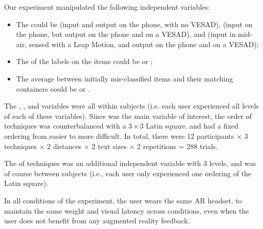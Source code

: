 Our experiment manipulated the following independent variables:

\begin{itemize}
 \item The  could be  (input and output on the phone, with no VESAD),  (input on the phone, but output on the phone and on a VESAD), and  (input in mid-air, sensed with a Leap Motion, and output on the phone and on a VESAD);
 \item The  of the labels on the items could be  or ;
 \item The average  between initially mis-classified items and their matching containers could be  or .
\end{itemize}

The , , and  variables were all within subjects (i.e. each user experienced all levels of each of these variables). Since  was the main variable of interest, the order of techniques was counterbalanced with a $3 \times 3$ Latin square.  and  had a fixed ordering from easier to more difficult. In total, there were 12 participants $\times$ 3 techniques $\times$ 2 distances $\times$ 2 text sizes $\times$ 2 repetitions = 288 trials.

The  of techniques was an additional independent variable with 3 levels, and was of course between subjects (i.e., each user only experienced one ordering of the Latin square).

In all conditions of the experiment, the user wears the same AR headset, to maintain the same weight and visual latency across conditions, even when the user does not benefit from any augmented reality feedback.


